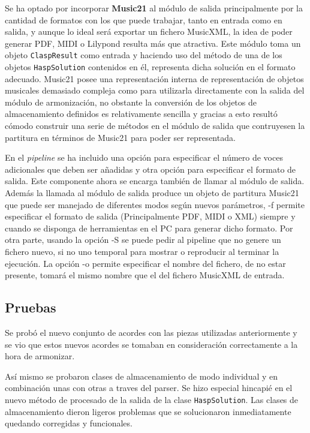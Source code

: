 Se ha optado por incorporar \textbf{Music21} al módulo de salida principalmente por la cantidad de formatos con los que puede trabajar, tanto en entrada como en salida, y aunque lo ideal será exportar un fichero MusicXML, la idea de poder generar PDF, MIDI o Lilypond resulta más que atractiva. Este módulo toma un objeto \texttt{ClaspResult} como entrada y haciendo uso del método de una de los objetos \texttt{HaspSolution} contenidos en él, representa dicha solución en el formato adecuado. Music21 posee una representación interna de representación de objetos musicales demasiado compleja como para utilizarla directamente con la salida del módulo de armonización, no obstante la conversión de los objetos de almacenamiento definidos es relativamente sencilla y gracias a esto resultó cómodo construir una serie de métodos en el módulo de salida que contruyesen la partitura en términos de Music21 para poder ser representada. 

En el \textit{pipeline} se ha incluido una opción para especificar el número de voces adicionales que deben ser añadidas y otra opción para especificar el formato de salida. Este componente ahora se encarga también de llamar al módulo de salida.
Además la llamada al módulo de salida produce un objeto de partitura Music21 que puede ser manejado de diferentes modos según nuevos parámetros, -f permite especificar el formato de salida (Principalmente PDF, MIDI o XML) siempre y cuando se disponga de herramientas en el PC para generar dicho formato. Por otra parte, usando la opción -S se puede pedir al pipeline que no genere un fichero nuevo, si no uno temporal para mostrar o reproducir al terminar la ejecución. La opción -o permite especificar el nombre del fichero, de no estar presente, tomará el mismo nombre que el del fichero MusicXML de entrada.

\subsection{Pruebas}
\label{subsec:fourth_iteration_test}
Se probó el nuevo conjunto de acordes con las piezas utilizadas anteriormente y se vio que estos nuevos acordes se tomaban en consideración correctamente a la hora de armonizar.

Así mismo se probaron clases de almacenamiento de modo individual y en combinación unas con otras a traves del parser. Se hizo especial hincapié en el nuevo método de procesado de la salida de la clase \texttt{HaspSolution}. Las clases de almacenamiento dieron ligeros problemas que se solucionaron inmediatamente quedando corregidas y funcionales.

